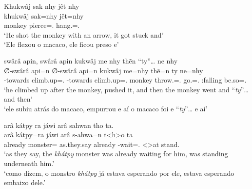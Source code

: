 \documentclass[output=paper,
modfonts,nonflat
]{langsci/langscibook}
\begin{document}
\largerpage
\ea  Khukwâj sak nhy jêt nhy \\[.3em]
\gll khukwâj sak=nhy           jêt=nhy               \\
     monkey  pierce=\AAnd.\Ds{} hang.\Sg{}=\AAnd.\Ds{} \\
\glt `He shot the monkey with an arrow, it got stuck and' \\
     `Ele flexou o macaco, ele ficou preso e' \\
\z

\newpage 
\ea  swârâ apin, swârâ apin kukwâj me nhy thẽn ``ty''\ldots{} ne nhy \\[.3em]
\gll ∅-swârâ        api=n               ∅-swârâ        api=n               kukwâj me=nhy                                thẽ=n             ty            ne=nhy           \\
     \Third-towards climb.up=\AAnd.\Ss{} \Third-towards climb.up=\AAnd.\Ss{} monkey throw.\Sg{}\footnotemark{}=\AAnd.\Ds{} go.\Sg=\AAnd.\Ss{} \Ontp:falling be.so=\AAnd.\Ds{} \\
\glt `he climbed up after the monkey, pushed it, and then the monkey went and ``\textit{ty}''\ldots{} and then' \\
     `ele subiu atrás do macaco, empurrou e aí o macaco foi e ``\textit{ty}''\ldots{} e aí' \\
\z

\ea  arâ kátpy ra jáwi arâ sahwan tho ta. \\[.3em]
\gll arâ     kátpy=ra       jáwi        arâ     s-ahwa=n               t<h>o                     ta          \\
     already monster=\Nom{} as.they.say already \Third-wait=\AAnd.\Ss{} <\Third>\footnotemark{}at stand.\Sg{} \\
\glt `as they say, the \textit{khátpy} monster was already waiting for him, was standing underneath him.' \\
     `como dizem, o monstro \textit{khátpy} já estava esperando por ele, estava esperando embaixo dele.' \\
\z
\end{document}

